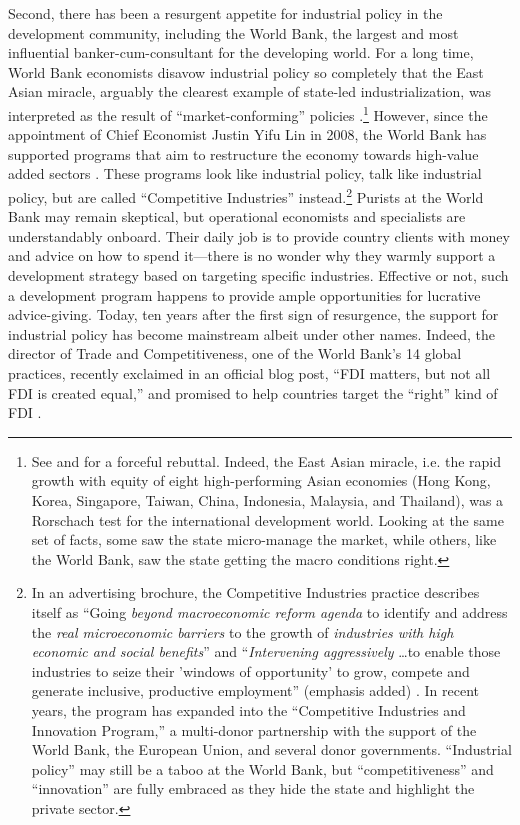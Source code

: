 Second, there has been a resurgent appetite for industrial policy in the
development community, including the World Bank, the largest and most
influential banker-cum-consultant for the developing world. For a long time,
World Bank economists disavow industrial policy so completely that the East
Asian miracle, arguably the clearest example of state-led industrialization, was
interpreted as the result of ``market-conforming'' policies
\citep[355]{WorldBank1993}.\footnote{See \citet{Amsden1994} and
  \citet{Rodrik1994} for a forceful rebuttal. Indeed, the East Asian miracle,
  i.e. the rapid growth with equity of eight high-performing Asian economies
  (Hong Kong, Korea, Singapore, Taiwan, China, Indonesia, Malaysia, and
  Thailand), was a Rorschach test for the international development world.
  Looking at the same set of facts, some saw the state micro-manage the market,
  while others, like the World Bank, saw the state getting the macro conditions
  right.} However, since the appointment of Chief Economist Justin Yifu Lin in
2008, the World Bank has supported programs that aim to restructure the economy
towards high-value added sectors \citep{Wade2012}. These programs look like
industrial policy, talk like industrial policy, but are called ``Competitive
Industries'' instead.\footnote{In an advertising brochure, the Competitive
  Industries practice describes itself as ``Going \textit{beyond macroeconomic
    reform agenda} to identify and address the \textit{real microeconomic
    barriers} to the growth of \textit{industries with high economic and social
    benefits}'' and ``\textit{Intervening aggressively} \ldots to enable those
  industries to seize their 'windows of opportunity' to grow, compete and
  generate inclusive, productive employment'' (emphasis added)
  \citep{WorldBank2011}. In recent years, the program has expanded into the
  ``Competitive Industries and Innovation Program,'' a multi-donor partnership
  with the support of the World Bank, the European Union, and several donor
  governments. ``Industrial policy'' may still be a taboo at the World Bank, but
  ``competitiveness'' and ``innovation'' are fully embraced as they hide the
  state and highlight the private sector.} Purists at the World Bank may remain
skeptical, but operational economists and specialists are understandably
onboard. Their daily job is to provide country clients with money and advice on
how to spend it---there is no wonder why they warmly support a development
strategy based on targeting specific industries. Effective or not, such a
development program happens to provide ample opportunities for lucrative
advice-giving. Today, ten years after the first sign of resurgence, the support
for industrial policy has become mainstream albeit under other names. Indeed,
the director of Trade and Competitiveness, one of the World Bank's 14 global
practices, recently exclaimed in an official blog post, ``FDI matters, but not
all FDI is created equal,'' and promised to help countries target the ``right''
kind of FDI \citep{Fruman2016}.

